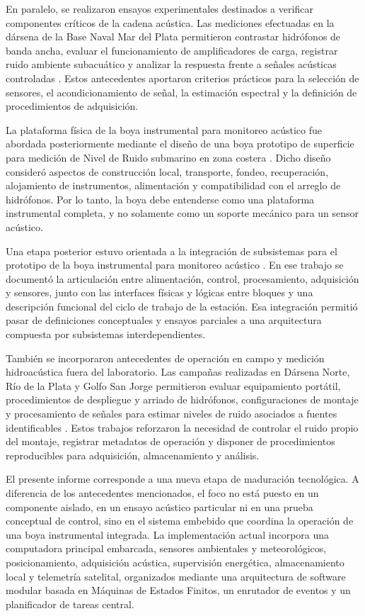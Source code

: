 En paralelo, se realizaron ensayos experimentales destinados a verificar componentes críticos de la cadena acústica. Las mediciones efectuadas en la dársena de la Base Naval Mar del Plata permitieron contrastar hidrófonos de banda ancha, evaluar el funcionamiento de amplificadores de carga, registrar ruido ambiente subacuático y analizar la respuesta frente a señales acústicas controladas \citep{AS0415_HidrofonosMDP}. Estos antecedentes aportaron criterios prácticos para la selección de sensores, el acondicionamiento de señal, la estimación espectral y la definición de procedimientos de adquisición.

La plataforma física de la boya instrumental para monitoreo acústico fue abordada posteriormente mediante el diseño de una boya prototipo de superficie para medición de Nivel de Ruido submarino en zona costera \citep{AS0119_DisenioBoya}. Dicho diseño consideró aspectos de construcción local, transporte, fondeo, recuperación, alojamiento de instrumentos, alimentación y compatibilidad con el arreglo de hidrófonos. Por lo tanto, la boya debe entenderse como una plataforma instrumental completa, y no solamente como un soporte mecánico para un sensor acústico.

Una etapa posterior estuvo orientada a la integración de subsistemas para el prototipo de la boya instrumental para monitoreo acústico \citep{AS0219_Subsistemas}. En ese trabajo se documentó la articulación entre alimentación, control, procesamiento, adquisición y sensores, junto con las interfaces físicas y lógicas entre bloques y una descripción funcional del ciclo de trabajo de la estación. Esa integración permitió pasar de definiciones conceptuales y ensayos parciales a una arquitectura compuesta por subsistemas interdependientes.

También se incorporaron antecedentes de operación en campo y medición hidroacústica fuera del laboratorio. Las campañas realizadas en Dársena Norte, Río de la Plata y Golfo San Jorge permitieron evaluar equipamiento portátil, procedimientos de despliegue y arriado de hidrófonos, configuraciones de montaje y procesamiento de señales para estimar niveles de ruido asociados a fuentes identificables \citep{AS0622_DarsenaRDP_GSJ,Bos2019_GSJ}. Estos trabajos reforzaron la necesidad de controlar el ruido propio del montaje, registrar metadatos de operación y disponer de procedimientos reproducibles para adquisición, almacenamiento y análisis.

El presente informe corresponde a una nueva etapa de maduración tecnológica. A diferencia de los antecedentes mencionados, el foco no está puesto en un componente aislado, en un ensayo acústico particular ni en una prueba conceptual de control, sino en el sistema embebido que coordina la operación de una boya instrumental integrada. La implementación actual incorpora una computadora principal embarcada, sensores ambientales y meteorológicos, posicionamiento, adquisición acústica, supervisión energética, almacenamiento local y telemetría satelital, organizados mediante una arquitectura de software modular basada en Máquinas de Estados Finitos, un enrutador de eventos y un planificador de tareas central.

